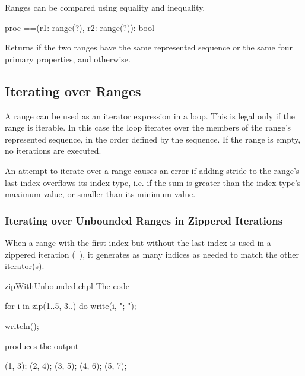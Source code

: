 Ranges can be compared using equality and inequality.

\begin{protohead}
proc ==(r1: range(?), r2: range(?)): bool
\end{protohead}
\begin{protobody}
Returns  if the two ranges have the same represented sequence
or the same four primary properties,
and  otherwise.
\end{protobody}

\subsection{Iterating over Ranges}
\label{Iterating_over_Ranges}

A range can be used as an iterator expression in a loop. This is legal
only if the range is iterable. In this case the loop iterates over the
members of the range's represented sequence, in the order defined by
the sequence. If the range is empty, no iterations are executed.

\begin{craychapel}
An attempt to iterate over a range causes an error if adding stride to
the range's last index overflows its index type, i.e. if the sum is
greater than the index type's maximum value, or smaller than its
minimum value.
\end{craychapel}

\subsubsection{Iterating over Unbounded Ranges in Zippered Iterations}
\label{Iterating_over_Unbounded_Ranges_in_Zippered_Iterations}

When a range with the first index but without the last index is used
in a zippered iteration (~),
it generates as many indices as needed
to match the other iterator(s).

\begin{chapelexample}{zipWithUnbounded.chpl}
The code
\begin{chapel}
for i in zip(1..5, 3..) do
  write(i, "; ");
\end{chapel}
\begin{chapelpost}
writeln();
\end{chapelpost}
produces the output 
\begin{chapelprintoutput}{}
(1, 3); (2, 4); (3, 5); (4, 6); (5, 7); 
\end{chapelprintoutput}
\end{chapelexample}

